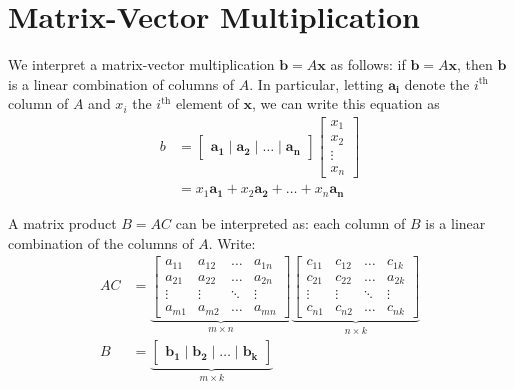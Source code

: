\chapter{Matrix-Vector Multiplication}\label{chap:matrix-vector-multiplication}
We interpret a matrix-vector multiplication \(\mathbf{b}=A\mathbf{x}\) as follows: if \(\mathbf{b}=A\mathbf{x}\), then \(\mathbf{b}\) is a linear combination of columns of \(A\). In particular, letting \(\mathbf{a_i}\) denote the \(i^{\text{th}}\) column of \(A\) and \(x_i\) the \(i^{\text{th}}\) element of \(\mathbf{x}\), we can write this equation as 
\begin{align*}b 
    &= \begin{bmatrix}\mathbf{a_1} \mid \mathbf{a_2} \mid \hdots \mid \mathbf{a_n}\end{bmatrix}\begin{bmatrix}x_1\\x_2\\\vdots\\x_n\end{bmatrix}\\
    &= x_1\mathbf{a_1}+x_2\mathbf{a_2}+\hdots+x_n\mathbf{a_n}
\end{align*}

A matrix product \(B=AC\) can be interpreted as: each column of \(B\) is a linear combination of the columns of \(A\). Write:
\begin{align*}
AC &= \underbrace{\begin{bmatrix}a_{11} & a_{12} & \hdots & a_{1n}\\a_{21} & a_{22} & \hdots & a_{2n}\\\vdots & \vdots & \ddots & \vdots\\a_{m1} & a_{m2} & \hdots & a_{mn}\end{bmatrix}}_{m\times n}\underbrace{\begin{bmatrix}c_{11} & c_{12} & \hdots & c_{1k}\\c_{21} & c_{22} & \hdots & a_{2k}\\\vdots & \vdots & \ddots & \vdots\\c_{n1} & c_{n2} & \hdots & c_{nk}\end{bmatrix}}_{n\times k}\\
B  &= \underbrace{\begin{bmatrix}\mathbf{b_1} \mid \mathbf{b_2} \mid \hdots \mid \mathbf{b_k}\end{bmatrix}}_{m\times k}
\end{align*}


